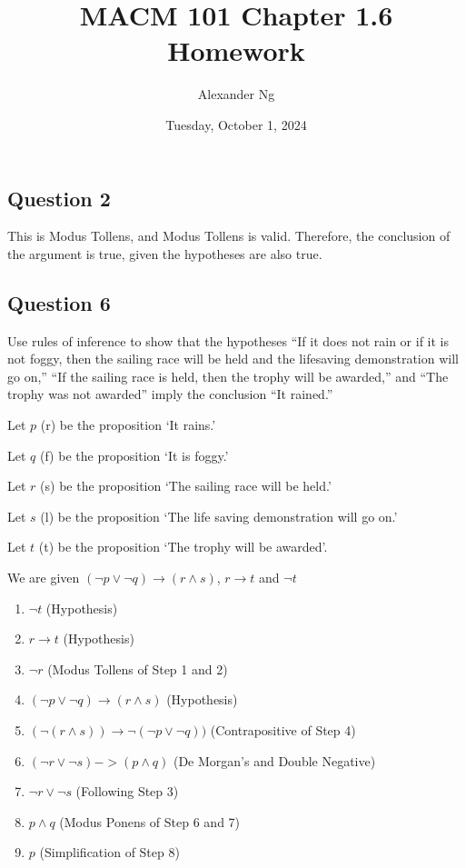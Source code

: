 \documentclass[12pt]{article}
\begin{document}
\title{MACM 101 Chapter 1.6 Homework}
\author{Alexander Ng}
\date{Tuesday, October 1, 2024}

\maketitle

\subsection*{Question 2}

This is Modus Tollens, and Modus Tollens is valid. Therefore, the conclusion of
the argument is true, given the hypotheses are also true. 

\subsection*{Question 6}

Use rules of inference to show that the hypotheses “If it does not rain or if
it is not foggy, then the sailing race will be held and the lifesaving 
demonstration will go on,” “If the sailing race is held, then the trophy will 
be awarded,” and “The trophy was not awarded” imply the conclusion “It rained.”

Let $p$ (r) be the proposition \enquote*{It rains.}

Let $q$ (f) be the proposition \enquote*{It is foggy.}

Let $r$ (s) be the proposition \enquote*{The sailing race will be held.}

Let $s$ (l) be the proposition \enquote*{The life saving demonstration will go on.}

Let $t$ (t) be the proposition \enquote*{The trophy will be awarded}.

We are given $(\neg p \lor \neg q) \to (r \land s)$, $r \to t$ and $\neg t$

\begin{enumerate}
  \item $\neg t$ (Hypothesis)
  \item $r \to t$ (Hypothesis)
  \item $\neg r$ (Modus Tollens of Step 1 and 2)
  \item $(\neg  p \lor  \neg  q) \to (r \land s)$ (Hypothesis)
  \item $(\neg (r \land s)) \to \neg (\neg p \lor \neg q))$ (Contrapositive of Step 4)
  \item $(\neg r \lor \neg s) -> (p \land q)$ (De Morgan's and Double Negative)
  \item $\neg r \lor  \neg s$ (Following Step 3)
  \item $p \land q$ (Modus Ponens of Step 6 and 7)
  \item $p$ (Simplification of Step 8)
\end{enumerate}
\end{document}
